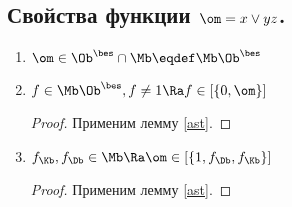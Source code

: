 \documentclass[unicode,10pt]{article}
\begin{document}
\subsection{Свойства функции $\om=x\vee yz$.}
\begin{enumerate}
 \item
   \begin{math}
     \om \in \Oib\cap\Mb \eqdef \Mb\Oib
   \end{math}
 \item
   \begin{lemma}
     \begin{math}
       f \in \Mb\Oib, f \ne 1 \Ra f \in \cls{0,\om}
     \end{math}
   \end{lemma}
   \begin{proof}
     Применим лемму \ref{ast}. \THEN
   \end{proof}
 \item
   \begin{lemma}
     \begin{math}
       \fK,\fD \in \Mb \Ra \om \in \cls{1, \fD, \fK}
     \end{math}
   \end{lemma}
   \begin{proof}
     Применим лемму \ref{ast}. \THEN
   \end{proof}
\end{enumerate}
\end{document}
